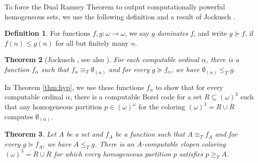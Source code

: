 \documentclass{amsart}
\newtheorem{thm}{Theorem}[section]
\theoremstyle{definition}
\newtheorem{defn}[thm]{Definition}
\theoremstyle{remark}
\begin{document}
To force the Dual Ramsey Theorem to output computationally powerful 
homogeneous sets, we use the following definition and 
a result of Jockusch \cite{Jockusch1968}.

\begin{defn}
For functions $f,g: \omega \rightarrow \omega$, we say $g$
\textit{dominates} $f$, and write $g \succeq f$, if $f(n) \leq g(n)$
for all but finitely many $n$.
\end{defn}

\begin{thm}[Jockusch \cite{Jockusch1968}, see also \mbox{\cite[Exercise 16-98]{Rogers_book}}]
\label{thm:fact}
For each computable ordinal $\alpha$, there is a function $f_\alpha$ such that $f_\alpha
\equiv_T \emptyset_{(\alpha)}$ and for every $g \succeq f_\alpha$, we have $\emptyset_{(\alpha)} \leq_T g$.
\end{thm}

In Theorem \ref{thm:hyp}, we use these functions $f_\alpha$ to show that for every
computable ordinal $\alpha$, there is a computable Borel code for a set
$R \subseteq (\omega)^3$ such that any homogeneous partition $p \in (\omega)^{\omega}$ for the coloring $(\omega)^3 = R \cup \overline{R}$ 
computes $\emptyset_{(\alpha)}$. 

\begin{thm}
\label{thm:main}\label{thm:self-moduli-theorem}
Let $A$ be a set and $f_A$ be a function such that $A \equiv_T f_A$
and for every $g \succeq f_A$, we have $A \leq_T g$. There is an
$A$-computable clopen coloring $(\omega)^3 = R \cup \overline{R}$ for which every homogeneous partition $p$ satisfies $p \geq_T A$.
\end{thm}
\end{document}
